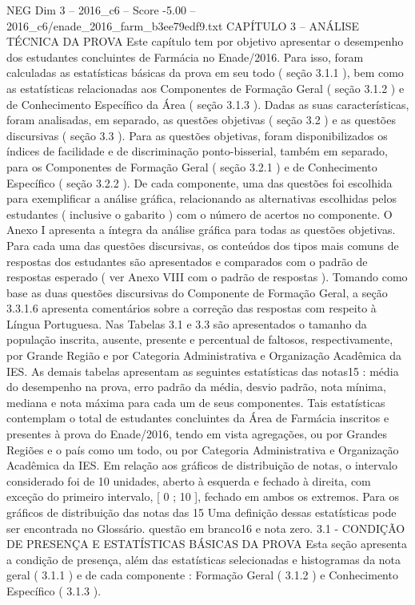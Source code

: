 \begin{textsample}{NEG Dim 3 – 2016\_c6 – Score -5.00 – 2016\_c6/enade\_2016\_farm\_b3ee79edf9.txt}  \label{ex:f3_neg_039}
CAPÍTULO 3 – ANÁLISE TÉCNICA DA PROVA Este capítulo tem por objetivo apresentar o desempenho dos estudantes concluintes de Farmácia no Enade/2016.
Para isso, foram calculadas as estatísticas básicas da prova em seu todo ( seção 3.1.1 ), bem como as estatísticas relacionadas aos Componentes de Formação Geral ( seção 3.1.2 ) e de Conhecimento Específico da Área ( seção 3.1.3 ).
Dadas as suas características, foram analisadas, em separado, as questões objetivas ( seção 3.2 ) e as questões discursivas ( seção 3.3 ).
Para as questões objetivas, foram disponibilizados os índices de facilidade e de discriminação ponto-bisserial, também em separado, para os Componentes de Formação Geral ( seção 3.2.1 ) e de Conhecimento Específico ( seção 3.2.2 ).
De cada componente, uma das questões foi escolhida para exemplificar a análise gráfica, relacionando as alternativas escolhidas pelos estudantes ( inclusive o gabarito ) com o número de acertos no componente.
O Anexo I apresenta a íntegra da análise gráfica para todas as questões objetivas.
Para cada uma das questões discursivas, os conteúdos dos tipos mais comuns de respostas dos estudantes são apresentados e comparados com o padrão de respostas esperado ( ver Anexo VIII com o padrão de respostas ).
Tomando como base as duas questões discursivas do Componente de Formação Geral, a seção 3.3.1.6 apresenta comentários sobre a correção das respostas com respeito à Língua Portuguesa.
Nas Tabelas 3.1 e 3.3 são apresentados o tamanho da população inscrita, ausente, presente e percentual de faltosos, respectivamente, por Grande Região e por Categoria Administrativa e Organização Acadêmica da IES.
As demais tabelas apresentam as seguintes estatísticas das notas15 : média do desempenho na prova, erro padrão da média, desvio padrão, nota mínima, mediana e nota máxima para cada um de seus componentes.
Tais estatísticas contemplam o total de estudantes concluintes da Área de Farmácia inscritos e presentes à prova do Enade/2016, tendo em vista agregações, ou por Grandes Regiões e o país como um todo, ou por Categoria Administrativa e Organização Acadêmica da IES.
Em relação aos gráficos de distribuição de notas, o intervalo considerado foi de 10 unidades, aberto à esquerda e fechado à direita, com exceção do primeiro intervalo, [ 0 ; 10 ], fechado em ambos os extremos.
Para os gráficos de distribuição das notas das 15 Uma definição dessas estatísticas pode ser encontrada no Glossário. questão em branco16 e nota zero. 3.1 - CONDIÇÃO DE PRESENÇA E ESTATÍSTICAS BÁSICAS DA PROVA Esta seção apresenta a condição de presença, além das estatísticas selecionadas e histogramas da nota geral ( 3.1.1 ) e de cada componente : Formação Geral ( 3.1.2 ) e Conhecimento Específico ( 3.1.3 ).

\end{textsample}

